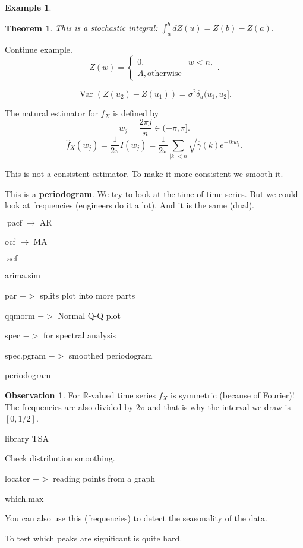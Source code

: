 \documentclass[12pt,a4paper, notitlepage]{book}
\theoremstyle{definition} %
\newtheorem{example}[definition]{Example}
\newtheorem{observation}[definition]{Observation}
\theoremstyle{plain} %
\newtheorem{theorem}[definition]{Theorem}
\newcommand{\R}{\mathbb R}
\DeclareMathOperator{\Var}{Var}
\DeclareMathOperator{\Acf}{acf}
\DeclareMathOperator{\Pacf}{pacf}
\DeclareMathOperator{\Ar}{AR}
\DeclareMathOperator{\Ma}{MA}
\begin{document}
\begin{example}
\begin{theorem}
This is a stochastic integral:
$\int_a^bdZ(u) = Z(b) - Z(a)$.
\end{theorem}

Continue example.
\[ Z(w) = \begin{cases} 0,  & w < n , \\ A , \text{otherwise} \end{cases} . \] 

\[ \Var(Z(u_2) - Z(u_1)) = \sigma^2 \delta_u(u_1, u_2]. \]

The natural estimator for $f_X$ is defined by 
\[ w_j = \frac{2 \pi j}{n} \in (-\pi, \pi]. \]
\[ \hat{f}_X(w_j) =\frac{1}{2\pi} I(w_j)= \frac{1}{2\pi} \sum_{|k| < n} \sqrt{\hat{\gamma}(k)e^{-ikw_j}} . \]

This is not a consistent estimator. To make it more consistent we smooth it. 

This is a {\bf periodogram}. We try to look at the time of time series. But we could look at frequencies (engineers do it a lot). And it is the same (dual). 
\end{example}









$ \Pacf \to \Ar $

ocf  $\to  \Ma $

$\Acf $

arima.sim

par $->$ splits plot into more parts

qqmorm $->$ Normal Q-Q plot

spec $->$ for spectral analysis

spec.pgram $->$ smoothed periodogram

periodogram

\begin{observation}
For $\R$-valued time series $f_X$ is symmetric (because of Fourier)! The frequencies are also divided by $2 \pi$ and that is why the interval we draw is $[0, 1/2]$.
\end{observation}

library TSA

Check distribution smoothing. 

locator $->$ reading points from a graph

which.max

You can also use this (frequencies) to detect the seasonality of the data.

To test which peaks are significant is quite hard. 
\end{document}
